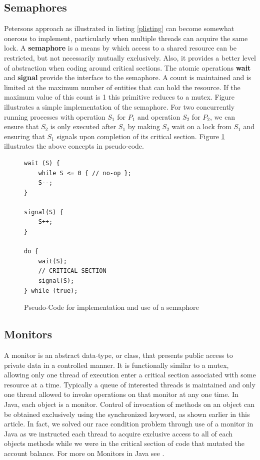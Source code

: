 \documentclass[10pt,a4paper]{article}
\begin{document}
\subsection{Semaphores}
Petersons approach as illustrated in listing \ref{plisting} can become somewhat onerous to implement, particularly when multiple threads can acquire the same lock. A  {\bf semaphore} is a means by which access to a shared resource can be restricted, but not necessarily mutually exclusively. Also, it provides a better level of abstraction when coding around critical sections. The atomic operations {\bf wait} and {\bf signal} provide the interface to the semaphore. A count is maintained and is limited at the maximum number of entities that can hold the resource. If the maximum value of this count is 1 this primitive reduces to a mutex. Figure illustrates a simple implementation of the semaphore. For two concurrently running processes with operation $S_1$ for $P_1$ and operation $S_2$ for $P_2$, we can ensure that $S_2$ is only executed after $S_1$ by making $S_2$ wait on a lock from $S_1$ and ensuring that $S_1$ signals upon completion of its critical section. Figure \ref{lsemaphore} illustrates the above concepts in pseudo-code.
\begin{figure}
\caption{Pseudo-Code for implementation and use of a semaphore \cite{OSCONCEPTS}}
\begin{center}
\begin{lstlisting}
wait (S) {
	while S <= 0 { // no-op };
	S--;
}

signal(S) {
	S++;
}

do {
	wait(S);
	// CRITICAL SECTION
	signal(S);
} while (true);
\end{lstlisting}
\label{lsemaphore}
\end{center}
\end{figure}
\subsection{Monitors}
A monitor is an abstract data-type, or class, that presents public access to private data in a controlled manner. It is functionally similar to a mutex, allowing only one thread of execution enter a critical section associated with some resource at a time. Typically a queue of interested threads is maintained and only one thread allowed to invoke operations on that monitor at any one time. In Java, each object is a monitor. Control of invocation of methods on an object can be obtained exclusively using the synchronized keyword, as shown earlier in this article. In fact, we solved our race condition problem through use of a monitor in Java as we instructed each thread to acquire exclusive access to all of each objects methods while we were in the critical section of code that mutated the account balance. For more on Monitors in Java see \cite{JAVASYNC}. 
\end{document}
